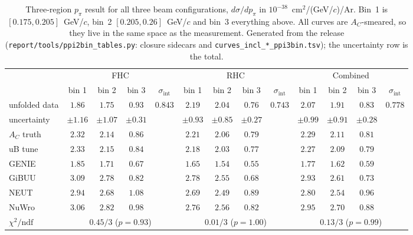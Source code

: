 \documentclass[11pt,a4paper]{article}
\begin{document}
\begin{table}[htbp]\centering
\caption{Three-region $p_\pi$ result for all three beam configurations, $d\sigma/dp_\pi$ in
  $10^{-38}$~cm$^2$/(GeV/$c$)/Ar. Bin~1 is $[0.175,0.205]$~GeV/$c$, bin~2 $[0.205,0.26]$~GeV/$c$
  and bin~3 everything above. All curves are $A_C$-smeared, so they live in the same space as
  the measurement. Generated from the release (\texttt{report/tools/ppi2bin\_tables.py}:
  closure sidecars and \texttt{curves\_incl\_*\_ppi3bin.tsv}); the uncertainty row is the total.}
\label{tab:ppi2bin}
\footnotesize\setlength{\tabcolsep}{2.5pt}
\begin{tabular}{lcccc|cccc|cccc}
\toprule
 & \multicolumn{4}{c|}{FHC} & \multicolumn{4}{c|}{RHC} & \multicolumn{4}{c}{Combined} \\
 & bin 1 & bin 2 & bin 3 & $\sigma_\mathrm{int}$ & bin 1 & bin 2 & bin 3 & $\sigma_\mathrm{int}$ & bin 1 & bin 2 & bin 3 & $\sigma_\mathrm{int}$ \\\midrule
unfolded data & $1.86$ & $1.75$ & $0.93$ & $0.843$ & $2.19$ & $2.04$ & $0.76$ & $0.743$ & $2.07$ & $1.91$ & $0.83$ & $0.778$ \\
uncertainty   & $\pm1.16$ & $\pm1.07$ & $\pm0.31$ &  & $\pm0.93$ & $\pm0.85$ & $\pm0.27$ &  & $\pm0.99$ & $\pm0.91$ & $\pm0.28$ &  \\
$A_C$ truth   & $2.32$ & $2.14$ & $0.86$ &  & $2.21$ & $2.06$ & $0.79$ &  & $2.29$ & $2.11$ & $0.81$ &  \\
uB tune       & $2.33$ & $2.15$ & $0.84$ &  & $2.18$ & $2.03$ & $0.77$ &  & $2.27$ & $2.09$ & $0.79$ &  \\\midrule
GENIE & $1.85$ & $1.71$ & $0.67$ &  & $1.65$ & $1.54$ & $0.55$ &  & $1.77$ & $1.62$ & $0.59$ &  \\
GiBUU & $3.09$ & $2.78$ & $0.82$ &  & $2.78$ & $2.55$ & $0.68$ &  & $2.93$ & $2.61$ & $0.73$ &  \\
NEUT  & $2.94$ & $2.68$ & $1.08$ &  & $2.69$ & $2.49$ & $0.89$ &  & $2.80$ & $2.54$ & $0.96$ &  \\
NuWro & $3.06$ & $2.82$ & $0.98$ &  & $2.76$ & $2.56$ & $0.82$ &  & $2.95$ & $2.70$ & $0.88$ &  \\
\midrule
$\chi^2/\mathrm{ndf}$ & \multicolumn{4}{c|}{$0.45/3$ ($p=0.93$)} & \multicolumn{4}{c|}{$0.01/3$ ($p=1.00$)} & \multicolumn{4}{c}{$0.13/3$ ($p=0.99$)} \\
\bottomrule
\end{tabular}
\end{table}
\end{document}
